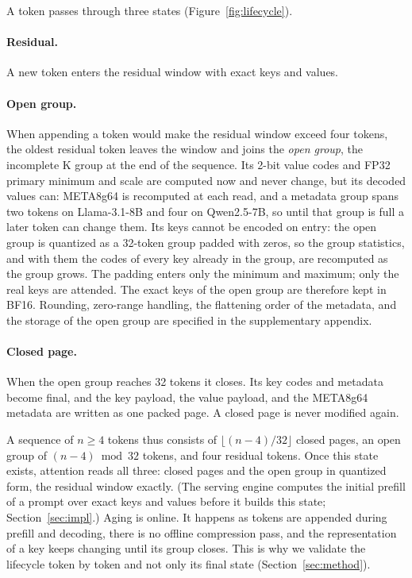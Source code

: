 \documentclass{article}
\begin{document}
A token passes through three states (Figure~\ref{fig:lifecycle}).

\paragraph{Residual.}
A new token enters the residual window with exact keys and values.

\paragraph{Open group.}\label{sec:lifecycle-open}
When appending a token would make the residual window exceed four tokens, the oldest residual token
leaves the window and joins the \emph{open group}, the
incomplete K group at the end of the sequence. Its 2-bit value codes and FP32 primary minimum and scale
are computed now and never change, but its decoded values can: META8g64 is recomputed at each read, and a
metadata group spans two tokens on Llama-3.1-8B and four on Qwen2.5-7B, so until that group is full a later
token can change them. Its keys cannot be encoded on entry: the open group is quantized as a 32-token group padded with zeros, so the group
statistics, and with them the codes of every key already in the group, are recomputed as the group
grows. The padding enters only the minimum and maximum; only the real keys are attended. The exact keys
of the open group are therefore kept in BF16. Rounding, zero-range handling, the flattening order of
the metadata, and the storage of the open group are specified in the supplementary appendix.

\paragraph{Closed page.}
When the open group reaches 32 tokens it closes. Its key codes and metadata become final, and the key
payload, the value payload, and the META8g64 metadata are written as one packed page. A closed page is
never modified again.

A sequence of $n \ge 4$ tokens thus consists of $\lfloor (n-4)/32 \rfloor$ closed pages, an open group
of $(n-4) \bmod 32$ tokens, and four residual tokens. Once this state exists, attention reads all
three: closed pages and the open group in quantized form, the residual window exactly. (The serving
engine computes the initial prefill of a prompt over exact keys and values before it builds this
state; Section~\ref{sec:impl}.) Aging is online. It happens as tokens are
appended during prefill and decoding, there is no offline compression pass, and the representation of a
key keeps changing until its group closes. This is why we validate the lifecycle token by token and not only
its final state (Section~\ref{sec:method}).
\end{document}

